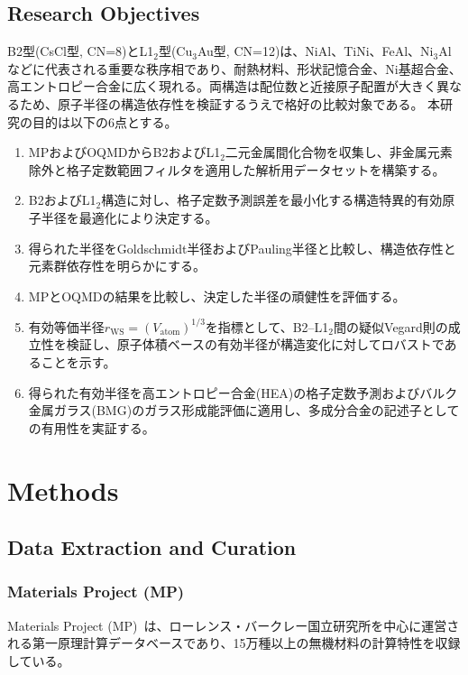 \documentclass[a4paper,10pt,5p]{elsarticle}
\begin{document}
\subsection{Research Objectives}
B2型(CsCl型, CN=8)とL1$_2$型(Cu$_3$Au型, CN=12)は、NiAl、TiNi、FeAl、Ni$_3$Alなどに代表される重要な秩序相であり、耐熱材料、形状記憶合金、Ni基超合金、高エントロピー合金に広く現れる。両構造は配位数と近接原子配置が大きく異なるため、原子半径の構造依存性を検証するうえで格好の比較対象である。
本研究の目的は以下の6点とする。
\begin{enumerate}
\setlength{\parskip}{0cm}
\setlength{\itemsep}{0cm}
    \item MPおよびOQMDからB2およびL1$_2$二元金属間化合物を収集し、非金属元素除外と格子定数範囲フィルタを適用した解析用データセットを構築する。
    \item B2およびL1$_2$構造に対し、格子定数予測誤差を最小化する構造特異的有効原子半径を最適化により決定する。
    \item 得られた半径をGoldschmidt半径およびPauling半径と比較し、構造依存性と元素群依存性を明らかにする。
    \item MPとOQMDの結果を比較し、決定した半径の頑健性を評価する。
    \item 有効等価半径$r_\mathrm{WS} = (V_\mathrm{atom})^{1/3}$を指標として、B2--L1$_2$間の疑似Vegard則の成立性を検証し、原子体積ベースの有効半径が構造変化に対してロバストであることを示す。
    \item 得られた有効半径を高エントロピー合金(HEA)の格子定数予測およびバルク金属ガラス(BMG)のガラス形成能評価に適用し、多成分合金の記述子としての有用性を実証する。
\end{enumerate}


\section{Methods}

\subsection{Data Extraction and Curation}

\subsubsection{Materials Project (MP)}

Materials Project (MP)~\citep{jain2013}は、ローレンス・バークレー国立研究所を中心に運営される第一原理計算データベースであり、15万種以上の無機材料の計算特性を収録している。
\end{document}
